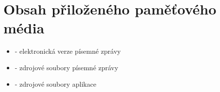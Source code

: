 
\chapter{Obsah přiloženého paměťového média}
    \begin{itemize}
        \item {} - elektronická verze písemné zprávy
        \item {} - zdrojové soubory písemné zprávy
        \item {} - zdrojové soubory aplikace
    \end{itemize}



